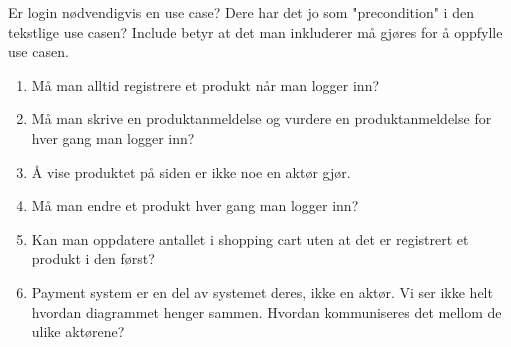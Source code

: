Er login nødvendigvis en use case? Dere har det jo som "precondition" i den tekstlige use casen? Include betyr at det man inkluderer må gjøres for å oppfylle use casen.

\begin{enumerate}

\item{
Må man alltid registrere et produkt når man logger inn?
}

\item{
Må man skrive en produktanmeldelse og vurdere en produktanmeldelse for hver gang man logger inn?
}

\item{
Å vise produktet på siden er ikke noe en aktør gjør.
}

\item{
Må man endre et produkt hver gang man logger inn?
}

\item{
Kan man oppdatere antallet i shopping cart uten at det er registrert et produkt i den først?
}

\item{
Payment system er en del av systemet deres, ikke en aktør. Vi ser ikke helt hvordan diagrammet henger sammen. Hvordan kommuniseres det mellom de ulike aktørene?
}

\end{enumerate}